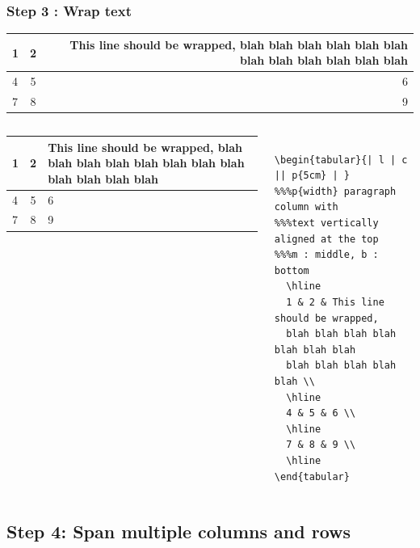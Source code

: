 \documentclass[article]{beamer}
\begin{document}
\begin{frame}[fragile]
\frametitle{Step 3 : Wrap text }

  \begin{tabular}{| l | c || r | }
    \hline
    1 & 2 & This line should be wrapped, blah blah blah blah blah blah blah blah blah blah blah blah \\ 
    \hline
    4 & 5 & 6 \\ 
    \hline
    7 & 8 & 9 \\
    \hline
  \end{tabular}


\begin{columns}
\tiny{
  \begin{tabular}{| l | c || p{3cm} | }
    \hline
    1 & 2 & This line should be wrapped, blah blah blah blah blah blah blah blah blah blah blah blah \\ 
    \hline
    4 & 5 & 6 \\ 
    \hline
    7 & 8 & 9 \\
    \hline
  \end{tabular}
 }	

\tiny{
	\begin{verbatim}	

\begin{tabular}{| l | c || p{5cm} | }  
%%%p{width} paragraph column with 
%%%text vertically aligned at the top
%%%m : middle, b : bottom
  \hline
  1 & 2 & This line should be wrapped, 
  blah blah blah blah blah blah blah
  blah blah blah blah blah \\ 
  \hline
  4 & 5 & 6 \\ 
  \hline
  7 & 8 & 9 \\
  \hline
\end{tabular}
  \end{verbatim}
}
\end{columns}

	
\end{frame}




\subsection{Step 4: Span multiple columns and rows}
\end{document}
